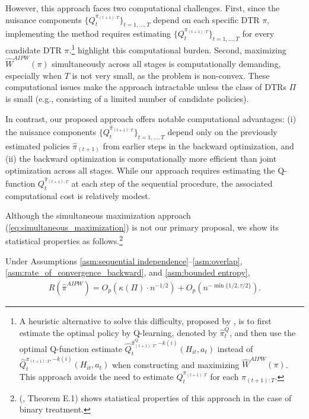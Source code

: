 However, this approach faces two computational challenges. First, since the nuisance components $\{Q_{t}^{\pi_{(t+1):T}}\}_{t=1,\ldots,T}$ depend on each specific DTR $\pi$, implementing the method requires estimating $\{Q_{t}^{\pi_{(t+1):T}}\}_{t=1,\ldots,T}$ for every candidate DTR $\pi$.\footnote{A heuristic alternative to solve this difficulty, proposed by \cite{Zhang_et_2013}, is to first estimate the optimal policy by Q-learning, denoted by $\hat{\pi}_{t}^{Q}$, and then use the optimal Q-function estimate $\widehat{Q}_{t}^{\hat{\pi}_{(t+1):T}^{Q},-k(i)}\left(H_{it},a_{t}\right)$ instead of $\widehat{Q}_{t}^{\pi_{(t+1):T},-k(i)}\left(H_{it},a_t\right)$ when constructing and maximizing $\widehat{W}^{AIPW}(\pi)$. This approach avoids the need to estimate $Q_{t}^{\pi_{(t+1):T}}$ for each $\pi_{(t+1):T}$.
} \citet{Nie_et_al_2021} highlight this computational burden.
Second, maximizing $\widehat{W}^{AIPW}(\pi)$ simultaneously across all stages is computationally demanding, especially when $T$ is not very small, as the problem is non-convex. These computational issues make the approach intractable unless the class of DTRs $\Pi$ is small (e.g., consisting of a limited number of candidate policies).

In contrast, our proposed approach offers notable computational advantages: (i) the nuisance components $\{Q_{t}^{\hat{\pi}_{(t+1):T}}\}_{t=1,\ldots,T}$ depend only on the previously estimated policies $\hat{\pi}_{(t+1)}$ from earlier steps in the backward optimization, and (ii) the backward optimization is computationally more efficient than joint optimization across all stages. While our approach requires estimating the Q-function $Q_{t}^{\hat{\pi}_{(t+1):T}}$ at each step of the sequential procedure, the associated computational cost is relatively modest.

Although the simultaneous maximization approach (\ref{eq:simultaneous_maximization}) is not our primary proposal, we show its statistical properties as follows.\footnote{\citeauthor{Sakaguchi_2021} (\citeyear{Sakaguchi_2021}, Theorem E.1) shows statistical properties of this approach in the case of binary treatment.}


\medskip

\begin{theorem}\label{thm:theorem_simlutaneous}
Under Assumptions \ref{asm:sequential independence}--\ref{asm:overlap}, \ref{asm:rate_of_convergence_backward}, and \ref{asm:bounded entropy},
\begin{align}
    R(\hat{\pi}^{AIPW}) = O_{p}\left(\kappa(\Pi) \cdot n^{-1/2}\right) + O_{p} (n^{-\min\{1/2,\tau/2\}}). \label{eq:theorem_result_AIPW}
\end{align}
\end{theorem}

